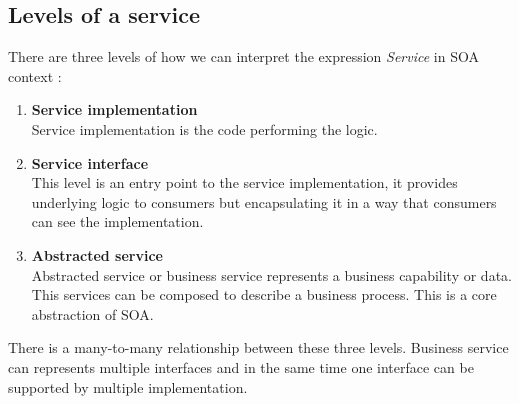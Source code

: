 \subsection{Levels of a service} 
\label{subsec:levels-of-service}

There are three levels of how we can interpret the expression \emph{Service} in SOA context \cite{agile-architecture}:
\begin{enumerate}
  \item \textbf{Service implementation} \hfill \\
Service implementation is the code performing the logic.
  \item \textbf{Service interface} \hfill \\ 
This level is an entry point to the service implementation, it provides underlying logic to consumers but encapsulating it in a way that consumers can see the implementation. 
  \item \textbf{Abstracted service} \hfill \\
Abstracted service or business service represents a business capability or data. This services can be composed to describe a business process. This is a core abstraction of SOA.
\end{enumerate}

There is a many-to-many relationship between these three levels. Business service can represents multiple interfaces and in the same time one interface can be supported by multiple implementation.




\bigskip


